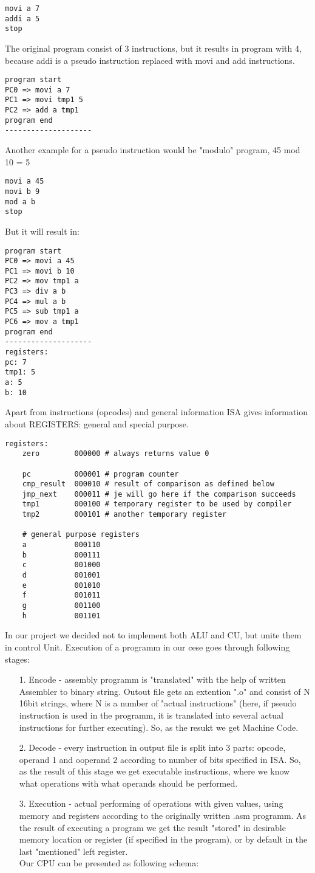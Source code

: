 \documentclass[11pt,a4paper]{article}
\begin{document}
\begin{verbatim}
movi a 7
addi a 5
stop
\end{verbatim}
The original program consist of 3 instructions, but it results in program with 4, because addi is a pseudo instruction replaced with movi and add instructions.
\begin{verbatim}
program start
PC0 => movi a 7
PC1 => movi tmp1 5
PC2 => add a tmp1
program end
--------------------
\end{verbatim}
Another example for a pseudo instruction would be "modulo" program, 45 mod 10 = 5
\begin{verbatim}
movi a 45
movi b 9
mod a b
stop
\end{verbatim}
But it will result in:
\begin{verbatim}
program start
PC0 => movi a 45
PC1 => movi b 10
PC2 => mov tmp1 a
PC3 => div a b
PC4 => mul a b
PC5 => sub tmp1 a
PC6 => mov a tmp1
program end
--------------------
registers:
pc: 7
tmp1: 5
a: 5
b: 10
\end{verbatim}
Apart from instructions (opcodes) and general information ISA gives information about REGISTERS: general and special purpose.
\begin{verbatim}
registers:
	zero 		000000 # always returns value 0
	
	pc			000001 # program counter
	cmp_result  000010 # result of comparison as defined below
	jmp_next    000011 # je will go here if the comparison succeeds
	tmp1        000100 # temporary register to be used by compiler
	tmp2		000101 # another temporary register

	# general purpose registers
	a       	000110
	b       	000111
	c      	 	001000
	d       	001001
	e       	001010
	f       	001011
	g      	 	001100
	h       	001101
\end{verbatim}
In our project we decided not to implement both ALU and CU, but unite them in control Unit. Execution of a programm in our cese goes through following stages:
\begin{enumerate}
	\item[1.] Encode - assembly programm is "translated" with the help of written Assembler to binary string. Outout file gets an extention ".o" and consist of N 16bit strings, where N is a number of "actual instructions" (here, if pseudo instruction is used in the programm, it is translated into several actual instructions for further executing). So, as the resukt we get Machine Code.
	\item[2.] Decode - every instruction in output file is split into 3 parts: opcode, operand 1 and ooperand 2 according to number of bits specified in ISA. So, as the result of this stage we get executable instructions, where we know what operations with what operands should be performed. 
	\item[3.] Execution - actual performing of operations with given values, using memory and registers according to the originally written .asm programm. As the result of executing a program we get the result "stored" in desirable memory location or register (if specified in the program), or by default in the last "mentioned" left register.\\
Our CPU can be presented as following schema:
\end{enumerate} 
\end{document}
